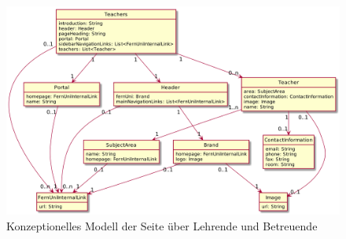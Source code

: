     \begin{figure}[htb]
        \centering
        \includegraphics[scale=\imageScalingFactor]{../resources/findings/case-study-1/model/model.png}
        \caption{Konzeptionelles Modell der Seite über Lehrende und Betreuende}
        \label{image:findingTeachersModelUml}
    \end{figure}